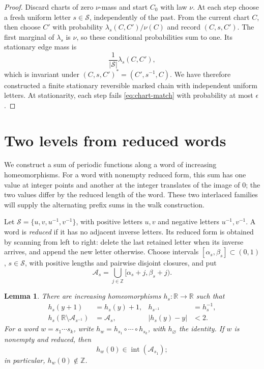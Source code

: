 \documentclass[11pt]{article}
\newtheorem{lemma}[theorem]{Lemma}
\theoremstyle{definition}
\theoremstyle{remark}
\newcommand{\R}{\mathbb R}
\newcommand{\Z}{\mathbb Z}
\newcommand{\cA}{\mathcal A}
\newcommand{\cS}{\mathcal S}
\begin{document}
\begin{proof}
Discard charts of zero $\nu$-mass and start $C_0$ with law $\nu$.
At each step choose a fresh uniform
letter $s\in\cS$, independently of the past. From the current chart $C$,
then choose $C'$ with probability $\lambda_s(C,C')/\nu(C)$ and record
$(C,s,C')$. The first marginal of $\lambda_s$ is $\nu$, so these
conditional probabilities sum to one.
Its stationary edge mass is
\begin{equation}\label{eq:chart-edge-mass}
 \frac{1}{|\cS|}\lambda_s(C,C'),
\end{equation}
which is invariant under $(C,s,C')^*=(C',s^{-1},C)$.
We have therefore constructed a finite stationary reversible marked
chain with independent uniform letters. At stationarity, each step
fails \eqref{eq:chart-match} with probability at most $\epsilon$.
\end{proof}

\section{Two levels from reduced words}\label{sec:action}

We construct a sum of periodic functions along a word of increasing
homeomorphisms. For a word with nonempty reduced form, this sum has one
value at integer points and another at the integer translates of the
image of $0$; the two values
differ by the reduced length of the word. These two interlaced families
will supply the alternating prefix sums in the walk construction.

Let $\cS=\{u,v,u^{-1},v^{-1}\}$, with positive letters $u,v$ and
negative letters $u^{-1},v^{-1}$.
A word is \emph{reduced} if it has no adjacent inverse letters.
Its reduced form is obtained by scanning from left to right: delete the
last retained letter when its inverse arrives, and append the new letter
otherwise.
Choose intervals $[\alpha_s,\beta_s]\subset(0,1)$, $s\in\cS$,
with positive lengths and pairwise disjoint closures, and put
\[
 \cA_s=\bigcup_{j\in\Z}[\alpha_s+j,\beta_s+j).
\]

\begin{lemma}\label{lem:action}
There are increasing homeomorphisms $h_s:\R\to\R$ such that
\begin{align}
 h_s(y+1)&=h_s(y)+1, & h_{s^{-1}}&=h_s^{-1},\label{eq:periodic-action}\\
 h_s(\R\setminus\cA_{s^{-1}})&=\cA_s,
 & |h_s(y)-y|&<2.\label{eq:pingpong}
\end{align}
For a word $w=s_1\cdots s_k$, write
$h_w=h_{s_1}\circ\cdots\circ h_{s_k}$, with $h_\varnothing$ the identity.
If $w$ is nonempty and reduced, then
\begin{equation}\label{eq:interior}
 h_w(0)\in\operatorname{int}(\cA_{s_1});
\end{equation}
in particular, $h_w(0)\notin\Z$.
\end{lemma}
\end{document}
